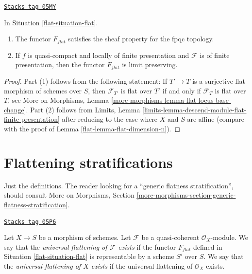 \begin{lemma}[Flat]
\label{flat-lemma-flat}
\href{https://stacks.math.columbia.edu/tag/05MY}{\texttt{Stacks tag 05MY}}

In Situation \ref{flat-situation-flat}.
\begin{enumerate}
\item The functor $F_{flat}$ satisfies the sheaf property for the fpqc topology.
\item If $f$ is quasi-compact and locally of finite presentation
and $\mathcal{F}$ is of finite presentation, then the functor
$F_{flat}$ is limit preserving.
\end{enumerate}
\end{lemma}

\begin{proof}

Part (1) follows from the following statement: If $T' \to T$ is a surjective
flat morphism of schemes over $S$, then $\mathcal{F}_{T'}$ is flat over $T'$
if and only if $\mathcal{F}_T$ is flat over $T$, see
More on Morphisms, Lemma \ref{more-morphisms-lemma-flat-locus-base-change}.
Part (2) follows from
Limits, Lemma \ref{limits-lemma-descend-module-flat-finite-presentation}
after reducing to the case where $X$ and $S$ are affine (compare with
the proof of
Lemma \ref{flat-lemma-flat-dimension-n}).
\end{proof}

\section{Flattening stratifications}
\label{flat-section-flattening}
Just the definitions. The reader looking for a
``generic flatness stratification'', should consult
More on Morphisms, Section
\ref{more-morphisms-section-generic-flatness-stratification}.

\begin{definition}[Flattening]
\label{flat-definition-flattening}
\href{https://stacks.math.columbia.edu/tag/05P6}{\texttt{Stacks tag 05P6}}

Let $X \to S$ be a morphism of schemes.
Let $\mathcal{F}$ be a quasi-coherent $\mathcal{O}_X$-module.
We say that the {\it universal flattening of $\mathcal{F}$ exists}
if the functor $F_{flat}$ defined in Situation \ref{flat-situation-flat}
is representable by a scheme $S'$ over $S$.
We say that the {\it universal flattening of $X$ exists}
if the universal flattening of $\mathcal{O}_X$ exists.
\end{definition}

